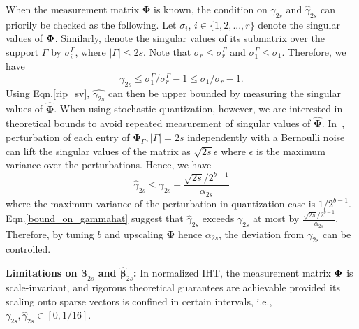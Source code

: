 \documentclass{article}
\begin{document}
When the measurement matrix $\boldsymbol{\Phi}$ is known, the condition on $\gamma_{2s}$ and $\hat{\gamma}_{2s}$ can priorily be checked as the following. Let $\sigma_i$, $i \in \{1, 2, ..., r \}$ denote the singular values of ${\bf \Phi}$. Similarly, denote the singular values of its submatrix over the support ${\Gamma}$ by $\sigma_i^{\Gamma}$, where $|\Gamma|\leq 2s$. Note that $\sigma_r \leq \sigma_r^{\Gamma}$ and $\sigma_1^{\Gamma} \leq \sigma_1$. Therefore, we have
\begin{equation}\label{rip_sv}
    \gamma_{2s} \leq \sigma_1^{\Gamma}/\sigma_r^{\Gamma}-1 \leq \sigma_1/\sigma_r-1.
\end{equation}
Using Eqn.\ref{rip_sv}, $\hat{\gamma_{2s}}$ can then be upper bounded
by measuring the singular values of $\hat{\boldsymbol{\Phi}}$. When using stochastic quantization, however, we are interested in theoretical bounds to avoid repeated measurement of singular values of $\hat{\boldsymbol{\Phi}}$. In~\cite{Steawart1990perturbation}, perturbation of each entry of $\boldsymbol{\Phi}_{\Gamma}, |\Gamma|=2s$ independently with a Bernoulli noise can lift the singular values of the matrix as $\sqrt{2s}\epsilon$ where $\epsilon$ is the maximum variance over the perturbations. Hence, we have 
\begin{equation}\label{bound_on_gammahat}
    \hat{\gamma}_{2s} \leq \gamma_{2s} + \frac{\sqrt{2s}/2^{b-1}}{\alpha_{2s}}
\end{equation}
where the maximum variance of the perturbation in quantization case is $1/2^{b-1}$. Eqn.\ref{bound_on_gammahat} suggest that $\hat{\gamma}_{2s}$ exceeds $\gamma_{2s}$ at most by $\frac{\sqrt{2s}/2^{b-1}}{\alpha_{2s}}$. Therefore, by tuning $b$ and upscaling $\boldsymbol{\Phi}$ hence $\alpha_{2s}$, the deviation from $\gamma_{2s}$ can be controlled.


{\bf Limitations on ${\boldsymbol{\beta}}_{2s}$ and $\hat{\boldsymbol{\beta}}_{2s}$:} In normalized IHT, the measurement matrix ${\bf \Phi}$ is scale-invariant, and rigorous theoretical guarantees are achievable provided its scaling onto sparse vectors is confined in certain intervals, i.e., ${\gamma}_{2s}, \hat{\gamma}_{2s}\in [0, 1/16]$. 

\end{document}
